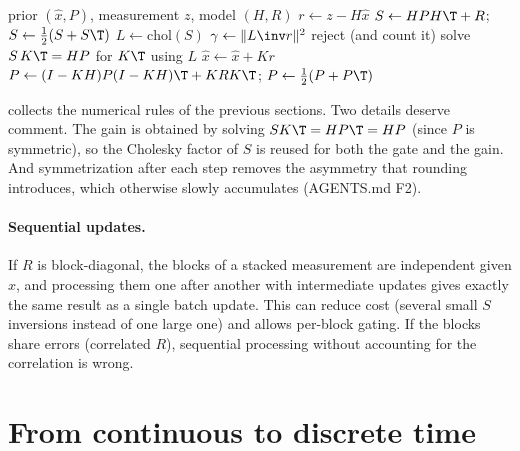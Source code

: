 \begin{algorithm}[t]
\caption{Numerically careful Kalman update}
\label{alg:kf-update}
\begin{algorithmic}[1]
\Require prior $(\hat x, P)$, measurement $z$, model $(H, R)$
\State $r \gets z - H\hat x$ 
\State $S \gets HPH\T + R$; \quad $S \gets \tfrac12(S + S\T)$
\State $L \gets \mathrm{chol}(S)$ 
\State $\gamma \gets \|L\inv r\|^2$ 
 \State \Return reject (and count it) \EndIf
\State solve $S\,K\T = HP$ for $K\T$ using $L$ 
\State $\hat x \gets \hat x + Kr$
\State $P \gets (I - KH)P(I - KH)\T + KRK\T$; \quad $P \gets \tfrac12(P + P\T)$
\end{algorithmic}
\end{algorithm}

 collects the numerical rules of the previous sections. Two details deserve
comment. The gain is obtained by solving $SK\T = HP\T = HP$ (since $P$ is symmetric), so the Cholesky factor
of $S$ is reused for both the gate and the gain. And symmetrization after each step removes the
asymmetry that rounding introduces, which otherwise slowly accumulates (AGENTS.md F2).

\paragraph{Sequential updates.} If $R$ is block-diagonal, the blocks of a stacked measurement are
independent given $x$, and processing them one after another with intermediate updates gives exactly
the same result as a single batch update. This can reduce cost (several small $S$ inversions instead of
one large one) and allows per-block gating. If the blocks share errors (correlated $R$), sequential
processing without accounting for the correlation is wrong.

\section{From continuous to discrete time}
\label{sec:discretization}

